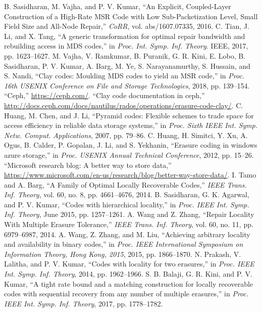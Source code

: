 \begin{multicols}{2}
\begin{thebibliography}{99}
 B. Sasidharan, M. Vajha, and P. V. Kumar, ``An Explicit, Coupled-Layer Construction of a High-Rate MSR Code with Low Sub-Packetization Level, Small Field Size and All-Node Repair,'' \textit{CoRR}, vol. abs/1607.07335, 2016.
 C. Tian, J. Li, and X. Tang, ``A generic transformation for optimal repair bandwidth and rebuilding access in MDS codes,'' in \textit{Proc. Int. Symp. Inf. Theory}. IEEE, 2017, pp. 1623--1627.
 M. Vajha, V. Ramkumar, B. Puranik, G. R. Kini, E. Lobo, B. Sasidharan, P. V. Kumar, A. Barg, M. Ye, S. Narayanamurthy, S. Hussain, and S. Nandi, ``Clay codes: Moulding MDS codes to yield an MSR code,'' in \textit{Proc. 16th USENIX Conference on File and Storage Technologies}, 2018, pp. 139--154.
 ``Ceph,'' \url{https://ceph.com/}.
 ``Clay code documentation in ceph,'' \url{http://docs.ceph.com/docs/nautilus/rados/operations/erasure-code-clay/}.
 C. Huang, M. Chen, and J. Li, ``Pyramid codes: Flexible schemes to trade space for access efficiency in reliable data storage systems,'' in \textit{Proc. Sixth IEEE Int. Symp. Netw. Comput. Applications}, 2007, pp. 79--86.
 C. Huang, H. Simitci, Y. Xu, A. Ogus, B. Calder, P. Gopalan, J. Li, and S. Yekhanin, ``Erasure coding in windows azure storage,'' in \textit{Proc. USENIX Annual Technical Conference}, 2012, pp. 15--26.
 ``Microsoft research blog: A better way to store data,'' \url{https://www.microsoft.com/en-us/research/blog/better-way-store-data/}.
 I. Tamo and A. Barg, ``A Family of Optimal Locally Recoverable Codes,'' \textit{IEEE Trans. Inf. Theory}, vol. 60, no. 8, pp. 4661--4676, 2014.
 B. Sasidharan, G. K. Agarwal, and P. V. Kumar, ``Codes with hierarchical locality,'' in \textit{Proc. IEEE Int. Symp. Inf. Theory}, June 2015, pp. 1257--1261.
 A. Wang and Z. Zhang, ``Repair Locality With Multiple Erasure Tolerance,'' \textit{IEEE Trans. Inf. Theory}, vol. 60, no. 11, pp. 6979--6987, 2014.
 A. Wang, Z. Zhang, and M. Liu, ``Achieving arbitrary locality and availability in binary codes,'' in \textit{Proc. IEEE International Symposium on Information Theory, Hong Kong, 2015}, 2015, pp. 1866--1870.
 N. Prakash, V. Lalitha, and P. V. Kumar, ``Codes with locality for two erasures,'' in \textit{Proc. IEEE Int. Symp. Inf. Theory}, 2014, pp. 1962--1966.
 S. B. Balaji, G. R. Kini, and P. V. Kumar, ``A tight rate bound and a matching construction for locally recoverable codes with sequential recovery from any number of multiple erasures,'' in \textit{Proc. IEEE Int. Symp. Inf. Theory}, 2017, pp. 1778--1782.

\end{thebibliography}
\end{multicols}
